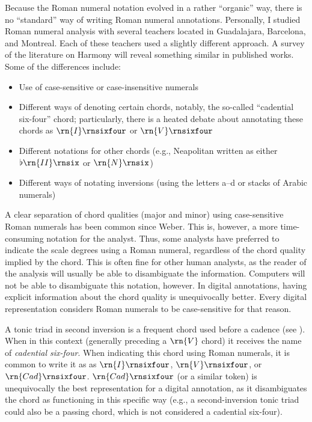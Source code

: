 Because the Roman numeral notation evolved in a rather
``organic'' way, there is no ``standard'' way of writing
Roman numeral annotations.
Personally, I studied Roman numeral analysis with several
teachers located in Guadalajara, Barcelona, and Montreal.
Each of these teachers used a slightly different approach. A
survey of the literature on Harmony will reveal something
similar in published works. Some of the differences include:
\begin{itemize}
    \item Use of case-sensitive or case-insensitive numerals
    \item Different ways of denoting certain chords,
    notably, the so-called ``cadential six-four'' chord;
    particularly, there is a heated debate about annotating
    these chords as $\rn{I}\rnsixfour$ or $\rn{V}\rnsixfour$
    \item Different notations for other chords (e.g.,
    Neapolitan written as either $\flat\rn{II}\rnsix$ or
    $\rn{N}\rnsix$)
    \item Different ways of notating inversions (using the
    letters a--d or stacks of Arabic numerals)
\end{itemize}

A clear separation of chord qualities (major and minor)
using case-sensitive Roman numerals has been common since
Weber. This is, however, a more time-consuming notation for
the analyst. Thus, some analysts have preferred to indicate
the scale degrees using a Roman numeral, regardless of the
chord quality implied by the chord. This is often fine for
other human analysts, as the reader of the analysis will
usually be able to disambiguate the information. Computers
will not be able to disambiguate this notation, however. In
digital annotations, having explicit information about the
chord quality is unequivocally better. Every digital
representation considers Roman numerals to be case-sensitive
for that reason.

A tonic triad in second inversion is a frequent chord used
before a cadence (see ). When in this
context (generally preceding a $\rn{V}$ chord) it receives
the name of \emph{cadential six-four}. When indicating this
chord using Roman numerals, it is common to write it as as
$\rn{I}\rnsixfour$, $\rn{V}\rnsixfour$, or
$\rn{Cad}\rnsixfour$. $\rn{Cad}\rnsixfour$ (or a similar
token) is unequivocally the best representation for a
digital annotation, as it disambiguates the chord as
functioning in this specific way (e.g., a second-inversion
tonic triad could also be a passing chord, which is not
considered a cadential six-four).

